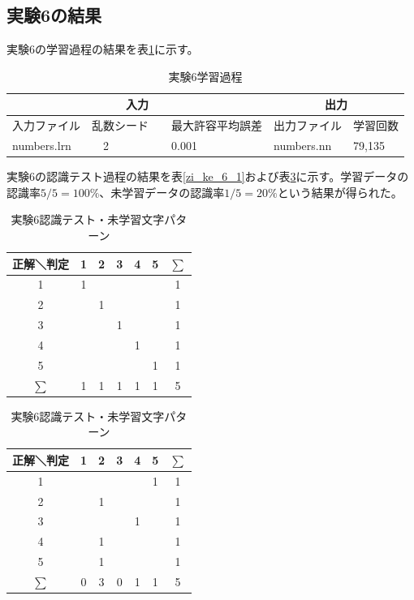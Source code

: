 \documentclass[final]{jarticle}[2012/05/15]
\begin{document}
\subsection{実験6の結果}
実験6の学習過程の結果を表\ref{zi_ga_6}に示す。\par
\begin{table}[h]
  \begin{center}
    \caption{実験6学習過程} \label{zi_ga_6}
    \begin{tabular}{|l|l|l|l|l|}\hline
      \multicolumn{3}{|c|}{入力} & \multicolumn{2}{|c|}{出力} \\ \hline
      入力ファイル & 乱数シード &　最大許容平均誤差 & 出力ファイル & 学習回数 \\ \hline
      numbers.lrn &　2 &　0.001 & numbers.nn & 79,135 \\ \hline
    \end{tabular}
  \end{center}
\end{table}
実験6の認識テスト過程の結果を表\ref{zi_ke_6_1}および表\ref{zi_ke_6_2}に示す。学習データの認識率$5/5=100\%$、未学習データの認識率$1/5=20\%$という結果が得られた。\par
\begin{table}[h]
\begin{center}
  \caption{実験6認識テスト・学習文字パターン} \label{zi_ke_6_1}
    \begin{tabular}{|c|c|c|c|c|c|c|}\hline
      正解＼判定 & 1 & 2 & 3 & 4 & 5 & $\sum$ \\ \hline
      1      & 1 &   &   &   &   & 1 \\ \hline
      2      &   & 1 &   &   &   & 1 \\ \hline
      3      &   &   & 1 &   &   & 1 \\ \hline
      4      &   &   &   & 1 &   & 1 \\ \hline
      5      &   &   &   &   & 1 & 1 \\ \hline
      $\sum$ & 1 & 1 & 1 & 1 & 1 & 5 \\ \hline
    \end{tabular}
    \caption{実験6認識テスト・未学習文字パターン} \label{zi_ke_6_2}
    \begin{tabular}{|c|c|c|c|c|c|c|}\hline
      正解＼判定 & 1 & 2 & 3 & 4 & 5 & $\sum$ \\ \hline
      1      &   &   &   &   & 1 & 1 \\ \hline
      2      &   & 1 &   &   &   & 1 \\ \hline
      3      &   &   &   & 1 &   & 1 \\ \hline
      4      &   & 1 &   &   &   & 1 \\ \hline
      5      &   & 1 &   &   &   & 1 \\ \hline
      $\sum$ & 0 & 3 & 0 & 1 & 1 & 5 \\ \hline
    \end{tabular}
  \end{center}
\end{table}
\pagebreak
\end{document}
